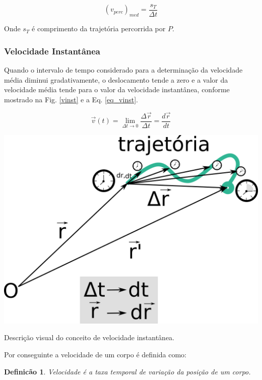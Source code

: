 \documentclass[a4paper, 11pt]{report}
\newtheorem{mydef}{Definicão}
\begin{document}
\begin{equation}
    \left( v_{perc} \right)_{med} = \frac{s_T}{\Delta t}
    \label{vperc}
\end{equation}

Onde $s_T$ é comprimento da trajetória percorrida por $P$.



\subsubsection*{Velocidade Instantânea}
Quando o intervalo de tempo considerado para a determinação da velocidade 
média diminui gradativamente, o deslocamento tende a zero e a valor da 
velocidade média tende para o valor da velocidade instantânea, conforme mostrado na 
Fig. \ref{vinst} e a Eq. \ref{eq_vinst}.

\begin{equation}
\vec{v}(t) = \lim_{\Delta t\rightarrow 0} \frac{\Delta \vec{r}}{\Delta t} = 
\frac{d \vec{r}}{d t}
\label{eq_vinst}
\end{equation}

\begin{staticfigure}
    \centering

    \includegraphics[scale=0.5]{img/vinst.png}

    \caption{\footnotesize Descrição visual do conceito de velocidade instantânea.}
    \label{vinst}
\end{staticfigure}

Por conseguinte a velocidade de um corpo é definida como:

\begin{mydef}
    Velocidade é a taxa temporal de variação da posição de um corpo.
\end{mydef}
\end{document}
